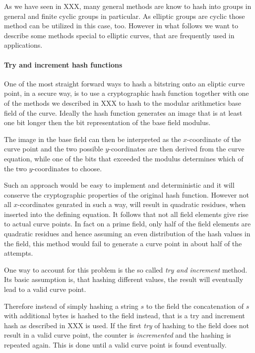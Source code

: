 As we have seen in XXX, many general methods are know to hash into groups in general and finite cyclic groups in particular. As elliptic groups are cyclic those method can be utilized in this case, too. However in what follows we want to describe some methods special to elliptic curves, that are frequently used in applications. 
\paragraph{Try and increment hash functions}
One of the most straight forward ways to hash a bitstring onto an eliptic curve point, in a  secure way, is to use a cryptographic hash function together with one of the methods we described in XXX to hash to the modular arithmetics base field of the curve. Ideally the hash function generates an image that is at least one bit longer then the bit representation of the base field modulus.

The image in the base field can then be interpreted as the $x$-coordinate of the curve point and the two possible $y$-coordinates are then derived from the curve equation, while one of the bits that exceeded the modulus determines which of the two $y$-coordinates to choose.

Such an approach would be easy to implement and deterministic and it will conserve the cryptographic properties of the original hash function. However not all $x$-ccordinates genrated in such a way, will result in quadratic residues, when inserted into the defining equation. It follows that not all field elements give rise to actual curve points. In fact
on a prime field, only half of the field elements are quadratic residues and hence assuming an even distribution of the hash values in the field, this method would fail to generate a curve point in about half of the attempts. 

One way to account for this problem is the so called \textit{try and increment} method. Its basic assumption is, that hashing different values, the result will eventually lead to a valid curve point. 

Therefore instead of simply hashing a string $s$ to the field the concatenation of $s$ with additional bytes is hashed to the field instead, that is a try and increment hash as described in XXX is used. If the first \textit{try} of hashing to the field does not result in a valid curve point, the counter is \textit{incremented} and the hashing is repeated again. This is done until a valid curve point is found eventually.

